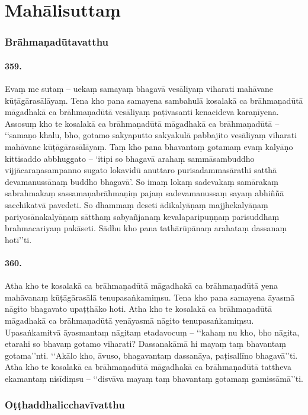 \section{Mahālisuttaṃ}

\subsubsection{Brāhmaṇadūtavatthu}

\paragraph{359.} Evaṃ me sutaṃ – uekaṃ samayaṃ bhagavā vesāliyaṃ viharati mahāvane kūṭāgārasālāyaṃ. Tena kho pana samayena sambahulā kosalakā ca brāhmaṇadūtā māgadhakā ca brāhmaṇadūtā vesāliyaṃ paṭivasanti kenacideva karaṇīyena. Assosuṃ kho te kosalakā ca brāhmaṇadūtā māgadhakā ca brāhmaṇadūtā – ‘‘samaṇo khalu, bho, gotamo sakyaputto sakyakulā pabbajito vesāliyaṃ viharati mahāvane kūṭāgārasālāyaṃ. Taṃ kho pana bhavantaṃ gotamaṃ evaṃ kalyāṇo kittisaddo abbhuggato – ‘itipi so bhagavā arahaṃ sammāsambuddho vijjācaraṇasampanno sugato lokavidū anuttaro purisadammasārathi satthā devamanussānaṃ buddho bhagavā’. So imaṃ lokaṃ sadevakaṃ samārakaṃ sabrahmakaṃ sassamaṇabrāhmaṇiṃ pajaṃ sadevamanussaṃ sayaṃ abhiññā sacchikatvā pavedeti. So dhammaṃ deseti ādikalyāṇaṃ majjhekalyāṇaṃ pariyosānakalyāṇaṃ sātthaṃ sabyañjanaṃ kevalaparipuṇṇaṃ parisuddhaṃ brahmacariyaṃ pakāseti. Sādhu kho pana tathārūpānaṃ arahataṃ dassanaṃ hotī’’ti.

\paragraph{360.} Atha kho te kosalakā ca brāhmaṇadūtā māgadhakā ca brāhmaṇadūtā yena mahāvanaṃ kūṭāgārasālā tenupasaṅkamiṃsu. Tena kho pana samayena āyasmā nāgito bhagavato upaṭṭhāko hoti. Atha kho te kosalakā ca brāhmaṇadūtā māgadhakā ca brāhmaṇadūtā yenāyasmā nāgito tenupasaṅkamiṃsu. Upasaṅkamitvā āyasmantaṃ nāgitaṃ etadavocuṃ – ‘‘kahaṃ nu kho, bho nāgita, etarahi so bhavaṃ gotamo viharati? Dassanakāmā hi mayaṃ taṃ bhavantaṃ gotama’’nti. ‘‘Akālo kho, āvuso, bhagavantaṃ dassanāya, paṭisallīno bhagavā’’ti. Atha kho te kosalakā ca brāhmaṇadūtā māgadhakā ca brāhmaṇadūtā tattheva ekamantaṃ nisīdiṃsu – ‘‘disvāva mayaṃ taṃ bhavantaṃ gotamaṃ gamissāmā’’ti.

\subsubsection{Oṭṭhaddhalicchavīvatthu}

